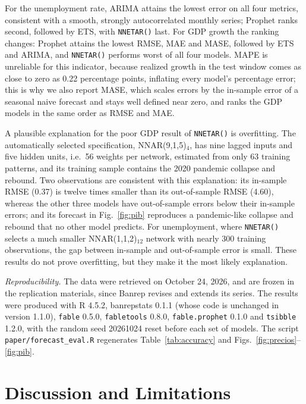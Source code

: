 \documentclass[conference]{IEEEtran}
\begin{document}
For the unemployment rate, ARIMA attains the lowest error on all four
metrics, consistent with a smooth, strongly autocorrelated monthly
series; Prophet ranks second, followed by ETS, with \texttt{NNETAR()}
last. For GDP growth the ranking changes: Prophet attains the lowest
RMSE, MAE and MASE, followed by ETS and ARIMA, and \texttt{NNETAR()}
performs worst of all four models. MAPE is unreliable for this
indicator, because realized growth in the test window comes as close to
zero as 0.22 percentage points, inflating every model's percentage
error; this is why we also report MASE, which scales errors by the
in-sample error of a seasonal naive forecast and stays well defined near
zero, and ranks the GDP models in the same order as RMSE and MAE.

A plausible explanation for the poor GDP result of \texttt{NNETAR()} is
overfitting. The automatically selected specification,
NNAR(9,1,5)$_4$, has nine lagged inputs and five hidden units, i.e.\ 56
weights per network, estimated from only 63 training patterns, and its
training sample contains the 2020 pandemic collapse and rebound. Two
observations are consistent with this explanation: its in-sample RMSE
(0.37) is twelve times smaller than its out-of-sample RMSE (4.60),
whereas the other three models have out-of-sample errors below their
in-sample errors; and its forecast in Fig.~\ref{fig:pib} reproduces a
pandemic-like collapse and rebound that no other model predicts. For
unemployment, where \texttt{NNETAR()} selects a much smaller
NNAR(1,1,2)$_{12}$ network with nearly 300 training observations, the
gap between in-sample and out-of-sample error is small. These results do
not prove overfitting, but they make it the most likely explanation.

\emph{Reproducibility.} The data were retrieved on October 24, 2026, and
are frozen in the replication materials, since Banrep revises and
extends its series. The results were produced with R 4.5.2,
banrepstats 0.1.1 (whose code is unchanged in version 1.1.0),
\texttt{fable} 0.5.0, \texttt{fabletools} 0.8.0,
\texttt{fable.prophet} 0.1.0 and \texttt{tsibble} 1.2.0, with the random
seed 20261024 reset before each set of models. The script
\texttt{paper/forecast\_eval.R} regenerates Table~\ref{tab:accuracy} and
Figs.~\ref{fig:precios}--\ref{fig:pib}.

\section{Discussion and Limitations}
\end{document}
